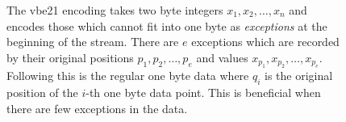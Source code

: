 \begin{figure}
\centering{}
	\caption[The vbe21 encoding.]{\label{fig:vbe21} The vbe21 encoding takes two byte integers
	$x_1,x_2,\dots,x_n$ and encodes those which cannot fit into one byte as
	\textit{exceptions} at the beginning of the stream. There are $e$
	exceptions which are recorded by their original positions
	$p_1,p_2,\dots,p_e$ and values $x_{p_1},x_{p_2},\dots,x_{p_e}$.
	Following this is the regular one byte data where $q_i$ is the original
	position of the $i$-th one byte data point. This is beneficial when
	there are few exceptions in the data.}
\end{figure}
